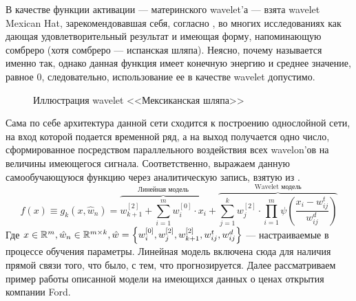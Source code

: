 В качестве функции активации --- материнского wavelet'а --- взята wavelet Mexican Hat, зарекомендовавшая себя, согласно \cite{alexandridis2014wavelet}, во многих исследованиях как дающая удовлетворительный результат и имеющая форму, напоминающую сомбреро (хотя сомбреро  --- испанская шляпа). Неясно, почему называется именно так, однако данная функция имеет конечную энергию и среднее значение, равное $0$, следовательно, использование ее в качестве wavelet допустимо.
\begin{figure}[H]
	\centering
	\caption{Иллюстрация wavelet <<Мексиканская шляпа>>}
	\label{pic::mexican_hat_wavelet}
\end{figure}
\noindent Сама по себе архитектура данной сети сходится к построению однослойной сети, на вход которой подается временной ряд, а на выход получается одно число, сформированное посредством параллельного воздействия всех wavelon'ов на величины имеющегося сигнала. Соответственно, выражаем данную самообучающуюся функцию через аналитическую запись, взятую из \cite{alexandridis2014wavelet}.
\begin{equation}
	f(x) \equiv g_{k}(x, \hat{w}_n) = \overbrace{w_{k + 1}^{[2]} + \sum_{i = 1}^m w_i^{[0]} \cdot x_{i}}^{\text{Линейная модель}} + \overbrace{\sum_{j = 1}^k w_{j}^{[2]} \cdot \prod_{i = 1}^{m} \psi\left(\frac{x_i - w_{ij}^{t}}{w_{ij}^{d}}\right)}^{\text{Wavelet модель}}
\end{equation}
\noindent Где $x \in \mathbb{R}^m, \hat{w}_n \in \mathbb{R}^{m \times k}, \hat{w} = \left\{ w_{i}^{[0]}, w_{j}^{[2]}, w_{k + 1}^{[2]}, w_{ij}^t, w_{ij}^d \right\}$ --- настраиваемые в процессе обучения параметры. Линейная модель включена сюда для наличия прямой связи того, что было, с тем, что прогнозируется. Далее рассматриваем пример работы описанной модели на имеющихся данных о ценах открытия компании Ford.

